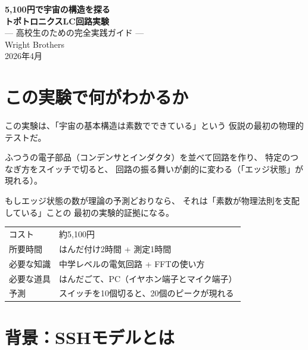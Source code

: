 \documentclass[12pt,a4paper]{article}
\begin{document}
\begin{center}
{\LARGE\bfseries 5,100円で宇宙の構造を探る}\\[0.5cm]
{\Large\bfseries トポトロニクスLC回路実験}\\[0.3cm]
{\large --- 高校生のための完全実践ガイド ---}\\[1.5cm]
{\large Wright Brothers}\\[0.3cm]
{2026年4月}
\end{center}

\vspace{0.5cm}

\tableofcontents

\newpage

\section{この実験で何がわかるか}

この実験は、「宇宙の基本構造は素数でできている」という
仮説の最初の物理的テストだ。

ふつうの電子部品（コンデンサとインダクタ）を並べて回路を作り、
特定のつなぎ方をスイッチで切ると、
回路の振る舞いが劇的に変わる（「エッジ状態」が現れる）。

もしエッジ状態の数が理論の予測どおりなら、
それは「素数が物理法則を支配している」ことの
最初の実験的証拠になる。

\begin{keybox}[実験の概要]
\begin{tabular}{ll}
コスト & 約5,100円 \\
所要時間 & はんだ付け2時間 + 測定1時間 \\
必要な知識 & 中学レベルの電気回路 + FFTの使い方 \\
必要な道具 & はんだごて、PC（イヤホン端子とマイク端子） \\
予測 & スイッチを10個切ると、20個のピークが現れる \\
\end{tabular}
\end{keybox}

\section{背景：SSHモデルとは}
\end{document}
